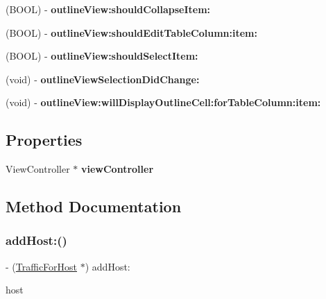 \begin{DoxyCompactItemize}
\item 
\mbox{\label{interface_captured_traffic_a2a48a763f58d06e0d0f76b4fc25cbd68}} 
(B\+O\+OL) -\/ {\bfseries outline\+View\+:should\+Collapse\+Item\+:}
\item 
\mbox{\label{interface_captured_traffic_a33aecc5285a4240cfaf18f9f6fbc706e}} 
(B\+O\+OL) -\/ {\bfseries outline\+View\+:should\+Edit\+Table\+Column\+:item\+:}
\item 
\mbox{\label{interface_captured_traffic_a2cf9d9ebaf56e1f0f77608b43cc3b03f}} 
(B\+O\+OL) -\/ {\bfseries outline\+View\+:should\+Select\+Item\+:}
\item 
\mbox{\label{interface_captured_traffic_a0ccd600588949a0b9c965e7d0fcb53ec}} 
(void) -\/ {\bfseries outline\+View\+Selection\+Did\+Change\+:}
\item 
\mbox{\label{interface_captured_traffic_aa2b4f4a337e6a21450dc24664f8e6ab1}} 
(void) -\/ {\bfseries outline\+View\+:will\+Display\+Outline\+Cell\+:for\+Table\+Column\+:item\+:}
\end{DoxyCompactItemize}
\subsection*{Properties}
\begin{DoxyCompactItemize}
\item 
\mbox{\label{interface_captured_traffic_a3a7a0e2fcfbe818dff4f03fb43d8c7f9}} 
View\+Controller $\ast$ {\bfseries view\+Controller}
\end{DoxyCompactItemize}


\subsection{Method Documentation}
\mbox{\label{interface_captured_traffic_a134d3585d95975a5067d01602bed36bb}} 
\subsubsection{\texorpdfstring{add\+Host\+:()}{addHost:()}}
{\footnotesize\ttfamily -\/ (\hyperlink{interface_traffic_for_host}{Traffic\+For\+Host} $\ast$) add\+Host\+: \begin{DoxyParamCaption}\item[{(N\+S\+String$\ast$)}]{host }\end{DoxyParamCaption}}

